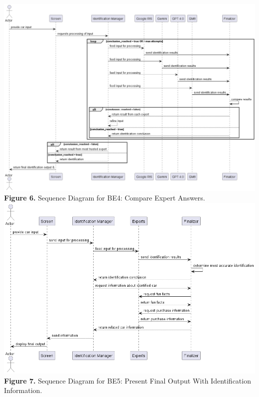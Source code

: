 \documentclass[]{article}
\begin{document}
\begin{center}
	\includegraphics[scale=0.4]{Sequence Diagrams/BE4_Sequence_Diagram.png}\\
	\textbf{Figure 6.} Sequence Diagram for BE4: Compare Expert Answers.\\

	\includegraphics[scale=0.55]{Sequence Diagrams/BE5_Sequence_Diagram.png}\\
	\textbf{Figure 7.} Sequence Diagram for BE5: Present Final Output With Identification Information.\\


\end{center}
\end{document}
